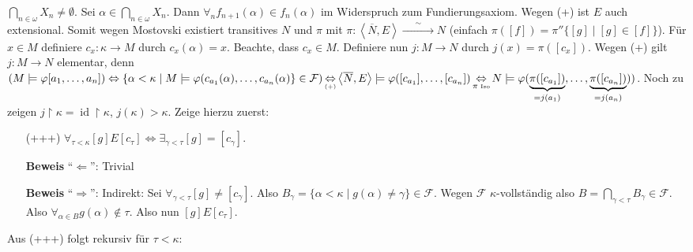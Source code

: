 \documentclass[a4paper,fontsize=11pt]{scrartcl}
\newcommand{\simrightarrow}{\xrightarrow{\phantom{\sim}\sim\phantom{\sim}}}
\newcommand{\id}{\operatorname{id}}
\begin{document}
\begin{itemize}
\begin{itemize}
                   $\bigcap_{n\in\omega}X_n\neq\emptyset$. Sei
                   $\alpha\in\bigcap_{n\in\omega}X_n$. Dann $\forall_n
                   f_{n+1}(\alpha)\in f_n(\alpha)$ im Widerspruch zum
                   Fundierungsaxiom. Wegen (+) ist $E$ auch
                   extensional. Somit wegen Mostovski existiert
                   transitives $N$ und $\pi$ mit
                   $\pi:\left<\overline{N},E\right>
                   \simrightarrow N$ (einfach
                   $\pi([f])=\pi''\{[g]\mid [g]\in[f]\}$). Für $x\in M$
                   definiere $c_x:\kappa\rightarrow M$ durch
                   $c_x(\alpha)=x$. Beachte, dass $c_x\in
                   M$. Definiere nun $j:M\rightarrow N$ durch
                   $j(x)=\pi([c_x])$. Wegen (+) gilt $j:M\rightarrow
                   N$ elementar, denn
                   $(M\models\varphi[a_1,\ldots,a_n]) \Leftrightarrow
                   \{\alpha<\kappa\mid M\models
                   \varphi(c_{a_1}(\alpha),\ldots,c_{a_n}(\alpha)\}\in
                   \mathcal{F}) \mathop{\Leftrightarrow}\limits_{\mbox{\tiny (+)}}\left<\overline{N},E\right>\models\varphi([c_{a_1}],\ldots,[c_{a_n}])
                   \mathop{\Leftrightarrow}\limits_{\tiny \pi\mbox{
                       Iso}}N\models\varphi(\underbrace{\pi([c_{a_1}])}_{=j(a_1)},\ldots,\underbrace{\pi([c_{a_n}])}_{=j(a_n)}))$. Noch
                   zu zeigen $j\upharpoonright \kappa =
                   \id\upharpoonright \kappa$,
                   $j(\kappa)>\kappa$. Zeige hierzu zuerst:
                   \begin{itemize}
                     \item[(+++)]$\forall_{\tau<\kappa}[g]E[c_\tau]\Leftrightarrow\exists_{\gamma<\tau}[g]=[c_\gamma]$.
                     \item[] {\bf Beweis} ``$\Leftarrow$'': Trivial
                     \item[] {\bf Beweis} ``$\Rightarrow$'': Indirekt:
                       Sei
                       $\forall_{\gamma<\tau}[g]\neq[c_\gamma]$. Also
                       $B_\gamma=\{\alpha<\kappa\mid g(\alpha)\neq\gamma\}\in\mathcal{F}$. Wegen
                       $\mathcal{F}$ $\kappa$-vollständig also
                       $B=\bigcap\limits_{\gamma<\tau}B_\gamma\in\mathcal{F}$. Also
                       $\forall_{\alpha\in
                         B}g(\alpha)\not\in\tau$. Also nun
                       $[g]E[c_\tau]$.
                   \end{itemize}
                   Aus (+++) folgt rekursiv für $\tau<\kappa$:

\end{itemize}
\end{itemize}
\end{document}
